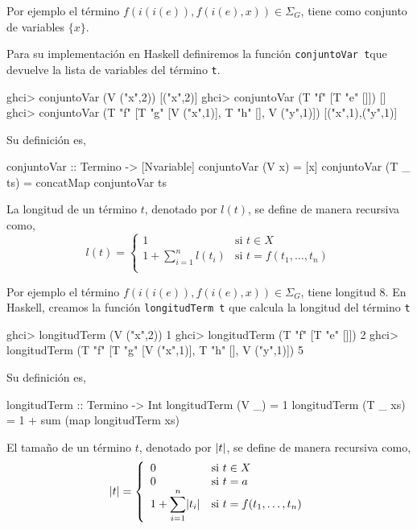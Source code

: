 Por ejemplo el término $f(i(i(e)),f(i(e),x)) \in \Sigma_G$, tiene como
conjunto de variables $\{x\}$.  

Para su implementación en Haskell definiremos la función
\texttt{conjuntoVar t}que devuelve la lista de variables del término
\texttt{t}.

\begin{sesion}
ghci> conjuntoVar (V ("x",2))
[("x",2)]
ghci> conjuntoVar (T "f" [T "e" []])
[]
ghci> conjuntoVar (T "f" [T "g" [V ("x",1)], T "h" [], V ("y",1)])
[("x",1),("y",1)]
\end{sesion}

Su definición es,

\begin{codigo}
conjuntoVar :: Termino -> [Nvariable]
conjuntoVar (V x)    = [x]
conjuntoVar (T _ ts) = concatMap conjuntoVar ts
\end{codigo}

\begin{defi} La longitud de un término $t$, denotado por $l(t)$, se
  define de manera recursiva como,
  \begin{equation*}
    l(t)=
    \left\lbrace
      \begin{array}{ll}
        1 & \text{si } t \in X \\
        1 + \displaystyle \sum^n_{i=1} l(t_i) & \text{si } t = f(t_1, \dots, t_n)\\
      \end{array}
    \right.
  \end{equation*}
\end{defi}

Por ejemplo el término $f(i(i(e)),f(i(e),x)) \in \Sigma_G$, tiene
longitud 8.  
En Haskell, creamos la función \texttt{longitudTerm t} que
calcula la longitud del término \texttt{t}

\begin{sesion}
ghci> longitudTerm (V ("x",2))
1
ghci> longitudTerm (T "f" [T "e" []])
2
ghci> longitudTerm (T "f" [T "g" [V ("x",1)], T "h" [], V ("y",1)])
5
\end{sesion}

Su definición es,

\begin{codigo}
longitudTerm :: Termino -> Int
longitudTerm (V _)    = 1
longitudTerm (T _ xs) = 1 + sum (map longitudTerm xs)
\end{codigo}

\begin{defi} El tamaño de un término $t$, denotado por $\lvert t\rvert $, se
  define de manera recursiva como,
  \begin{equation*}
    \lvert t\rvert=
    \left\lbrace
      \begin{array}{ll}
        0 & \text{si } t \in X \\
        0 & \text{si } t = a \\
        1 + \displaystyle \sum^n_{i=1} \lvert t_i\rvert & \text{si } t = f(t_1, \dots, t_n)\\
      \end{array}
    \right.
  \end{equation*}
\end{defi}

